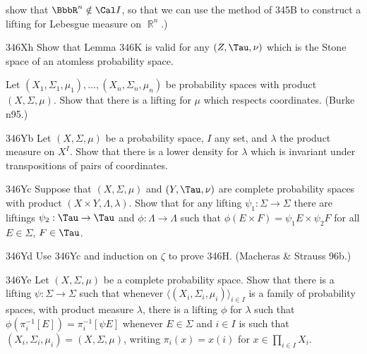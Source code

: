 {

\noindent show that $\BbbR^n\notin\Cal I$, so that we can use the
method of 345B to construct a lifting for Lebesgue measure on $\BbbR^n$.)

\spheader 346Xh Show that Lemma 346K is valid for any $(Z,\Tau,\nu)$
which is the Stone space of an atomless probability space.

Let $(X_1,\Sigma_1,\mu_1),\ldots,(X_n,\Sigma_n,\mu_n)$
be probability spaces with product $(X,\Sigma,\mu)$.   Show that there
is a lifting for $\mu$ which respects coordinates.   ({\smc Burke n95}.)

\spheader 346Yb Let $(X,\Sigma,\mu)$ be a
probability space, $I$ any set, and $\lambda$ the product measure on
$X^I$.   Show that there is a lower density for $\lambda$ which is
invariant under transpositions of pairs of coordinates.

\spheader 346Yc Suppose that $(X,\Sigma,\mu)$
and $(Y,\Tau,\nu)$ are complete probability spaces with product
$(X\times Y,\Lambda,\lambda)$.   Show that for any lifting
$\psi_1:\Sigma\to\Sigma$ there are liftings $\psi_2:\Tau\to\Tau$ and
$\phi:\Lambda\to\Lambda$ such that
$\phi(E\times F)=\psi_1E\times\psi_2F$ for all $E\in\Sigma$, $F\in\Tau$.

\spheader 346Yd Use 346Yc and induction on $\zeta$ to prove 346H.
({\smc Macheras \& Strauss 96b}.)

\spheader 346Ye Let $(X,\Sigma,\mu)$ be a complete probability space.
Show that there is a lifting $\psi:\Sigma\to\Sigma$ such that whenever
$\langle(X_i,\Sigma_i,\mu_i)\rangle_{i\in I}$ is a family of probability
spaces, with product measure $\lambda$, there is a lifting $\phi$ for
$\lambda$ such that
$\phi(\pi_i^{-1}[E])=\pi_i^{-1}[\psi E]$ whenever $E\in\Sigma$ and
$i\in I$ is such that $(X_i,\Sigma_i,\mu_i)=(X,\Sigma,\mu)$, writing
$\pi_i(x)=x(i)$ for $x\in\prod_{i\in I}X_i$.
}%

